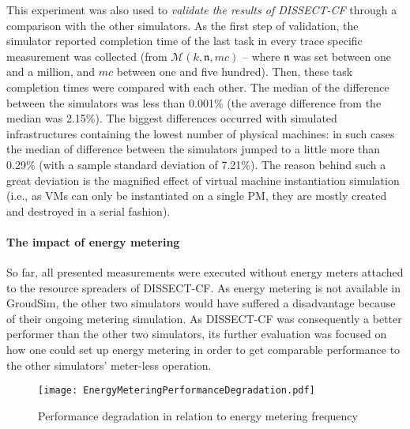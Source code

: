 \documentclass[sort, compress, 5p]{elsarticle}
\begin{document}
This experiment was also used to \emph{validate the results of DISSECT-CF} through a comparison with the other simulators. As the first step of validation, the simulator reported completion time of the last task in every trace specific measurement was collected (from $\mathcal{M}(k,\mathfrak{n},mc)$ -- where $\mathfrak{n}$ was set between one and a million, and $mc$ between one and five hundred). Then, these task completion times were compared with each other. The median of the difference between the simulators was less than 0.001\% (the average difference from the median was 2.15\%). The biggest differences occurred with simulated infrastructures containing the lowest number of physical machines: in such cases the median of difference between the simulators jumped to a little more than 0.29\% (with a sample standard deviation of 7.21\%). The reason behind such a great deviation is the magnified effect of virtual machine instantiation simulation (i.e., as VMs can only be instantiated on a single PM, they are mostly created and destroyed in a serial fashion).

\paragraph{The impact of energy metering}

So far, all presented measurements were executed without energy meters attached to the resource spreaders of DISSECT-CF. As energy metering is not available in GroudSim, the other two simulators would have suffered a disadvantage because of their ongoing metering simulation. As DISSECT-CF was consequently a better performer than the other two simulators, its further evaluation was focused on how one could set up energy metering in order to get comparable performance to the other simulators' meter-less operation.

\begin{figure}[tb]
\centering
\texttt{[image: EnergyMeteringPerformanceDegradation.pdf]}
\caption{Performance degradation in relation to energy metering frequency\label{FIG-EnergyPerformanceDrop}}
\end{figure}
\end{document}
